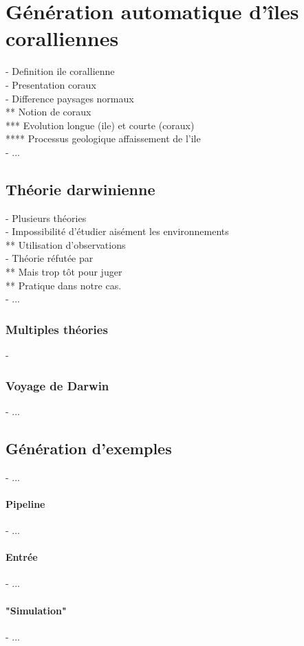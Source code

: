 \chapter{Génération automatique d'îles coralliennes}
\minitoc

- Definition ile corallienne \\
- Presentation coraux \\
- Difference paysages normaux \\
** Notion de coraux \\
*** Evolution longue (ile) et courte (coraux) \\
**** Processus geologique affaissement de l'ile \\
- ...

\section{Théorie darwinienne}
- Plusieurs théories \\
- Impossibilité d'étudier aisément les environnements \\
** Utilisation d'observations \\
- Théorie réfutée par \cite{Droxler2021} \\
** Mais trop tôt pour juger \\
** Pratique dans notre cas. \\
- ...

\subsection{Multiples théories}
- 

\subsection{Voyage de Darwin}
- ...
\section{Génération d'exemples}
- ...
\subsubsection{Pipeline}
- ...
\subsubsection{Entrée}
- ...
\subsubsection{"Simulation"}
- ...
